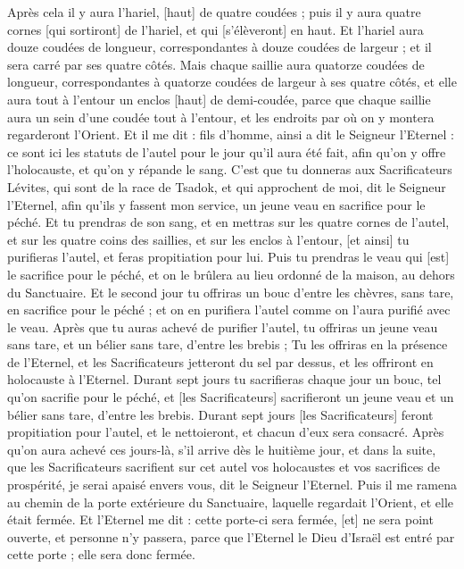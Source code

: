 \begin{multicols}{2}
Après cela il y aura l'hariel, [haut] de quatre coudées ; puis il y aura quatre cornes [qui sortiront] de l'hariel, et qui [s'élèveront] en haut.
Et l'hariel aura douze coudées de longueur, correspondantes à douze coudées de largeur ; et il sera carré par ses quatre côtés.
Mais chaque saillie aura quatorze coudées de longueur, correspondantes à quatorze coudées de largeur à ses quatre côtés, et elle aura tout à l'entour un enclos [haut] de demi-coudée, parce que chaque saillie aura un sein d'une coudée tout à l'entour, et les endroits par où on y montera regarderont l'Orient.
Et il me dit : fils d'homme, ainsi a dit le Seigneur l'Eternel : ce sont ici les statuts de l'autel pour le jour qu'il aura été fait, afin qu'on y offre l'holocauste, et qu'on y répande le sang.
C'est que tu donneras aux Sacrificateurs Lévites, qui sont de la race de Tsadok, et qui approchent de moi, dit le Seigneur l'Eternel, afin qu'ils y fassent mon service, un jeune veau en sacrifice pour le péché.
Et tu prendras de son sang, et en mettras sur les quatre cornes de l'autel, et sur les quatre coins des saillies, et sur les enclos à l'entour, [et ainsi] tu purifieras l'autel, et feras propitiation pour lui.
Puis tu prendras le veau qui [est] le sacrifice pour le péché, et on le brûlera au lieu ordonné de la maison, au dehors du Sanctuaire.
Et le second jour tu offriras un bouc d'entre les chèvres, sans tare, en sacrifice pour le péché ; et on en purifiera l'autel comme on l'aura purifié avec le veau.
Après que tu auras achevé de purifier l'autel, tu offriras un jeune veau sans tare, et un bélier sans tare, d'entre les brebis ;
Tu les offriras en la présence de l'Eternel, et les Sacrificateurs jetteront du sel par dessus, et les offriront en holocauste à l'Eternel.
Durant sept jours tu sacrifieras chaque jour un bouc, tel qu'on sacrifie pour le péché, et [les Sacrificateurs] sacrifieront un jeune veau et un bélier sans tare, d'entre les brebis.
Durant sept jours [les Sacrificateurs] feront propitiation pour l'autel, et le nettoieront, et chacun d'eux sera consacré.
Après qu'on aura achevé ces jours-là, s'il arrive dès le huitième jour, et dans la suite, que les Sacrificateurs sacrifient sur cet autel vos holocaustes et vos sacrifices de prospérité, je serai apaisé envers vous, dit le Seigneur l'Eternel.
\VerseOne{}Puis il me ramena au chemin de la porte extérieure du Sanctuaire, laquelle regardait l'Orient, et elle était fermée.
Et l'Eternel me dit : cette porte-ci sera fermée, [et] ne sera point ouverte, et personne n'y passera, parce que l'Eternel le Dieu d'Israël est entré par cette porte ; elle sera donc fermée.

\end{multicols}
